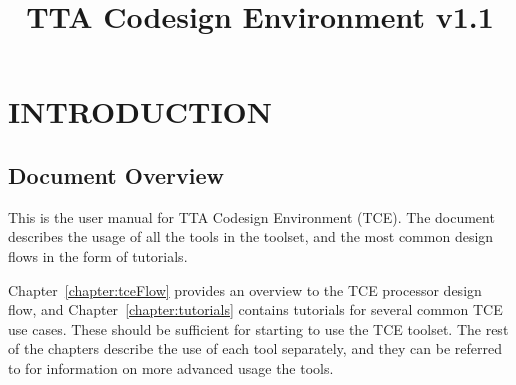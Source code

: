 \documentclass[twoside]{tceusermanual}
\begin{document}
\title{TTA Codesign Environment v1.1}
\maketitle

\tableofcontents

\chapter{INTRODUCTION}

\section{Document Overview}

This is the user manual for TTA Codesign Environment (TCE). The document
describes the usage of all the tools in the toolset, and the most common
design flows in the form of tutorials. 

Chapter~\ref{chapter:tceFlow} provides an overview to the TCE
processor design flow, and Chapter~\ref{chapter:tutorials} contains
tutorials for several common TCE use cases. These should be sufficient
for starting to use the TCE toolset.  The rest of the chapters
describe the use of each tool separately, and they can be referred to
for information on more advanced usage the tools.
\end{document}
